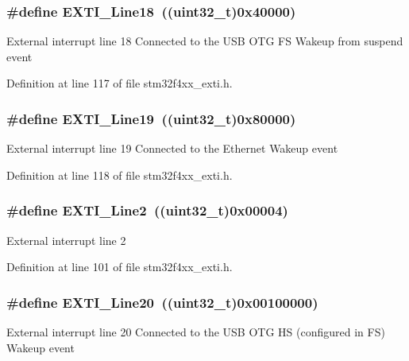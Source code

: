 \hypertarget{group___e_x_t_i___lines_ga6cdf346a3e7a3c8dbb036aca6741207c}{
\subsubsection[{E\-X\-T\-I\-\_\-\-Line18}]{\setlength{\rightskip}{0pt plus 5cm}\#define E\-X\-T\-I\-\_\-\-Line18~((uint32\-\_\-t)0x40000)}}\label{group___e_x_t_i___lines_ga6cdf346a3e7a3c8dbb036aca6741207c}
External interrupt line 18 Connected to the U\-S\-B O\-T\-G F\-S Wakeup from suspend event 

Definition at line 117 of file stm32f4xx\-\_\-exti.\-h.

\hypertarget{group___e_x_t_i___lines_ga49ac0744621f88d432d85838483ad1de}{
\subsubsection[{E\-X\-T\-I\-\_\-\-Line19}]{\setlength{\rightskip}{0pt plus 5cm}\#define E\-X\-T\-I\-\_\-\-Line19~((uint32\-\_\-t)0x80000)}}\label{group___e_x_t_i___lines_ga49ac0744621f88d432d85838483ad1de}
External interrupt line 19 Connected to the Ethernet Wakeup event 

Definition at line 118 of file stm32f4xx\-\_\-exti.\-h.

\hypertarget{group___e_x_t_i___lines_gaec4189bb2709c8c15a0339d1b0b9865a}{
\subsubsection[{E\-X\-T\-I\-\_\-\-Line2}]{\setlength{\rightskip}{0pt plus 5cm}\#define E\-X\-T\-I\-\_\-\-Line2~((uint32\-\_\-t)0x00004)}}\label{group___e_x_t_i___lines_gaec4189bb2709c8c15a0339d1b0b9865a}
External interrupt line 2 

Definition at line 101 of file stm32f4xx\-\_\-exti.\-h.

\hypertarget{group___e_x_t_i___lines_ga3ebc4564ac4ca4e1613f98d81a707f2a}{
\subsubsection[{E\-X\-T\-I\-\_\-\-Line20}]{\setlength{\rightskip}{0pt plus 5cm}\#define E\-X\-T\-I\-\_\-\-Line20~((uint32\-\_\-t)0x00100000)}}\label{group___e_x_t_i___lines_ga3ebc4564ac4ca4e1613f98d81a707f2a}
External interrupt line 20 Connected to the U\-S\-B O\-T\-G H\-S (configured in F\-S) Wakeup event 

